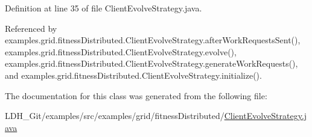 Definition at line 35 of file Client\-Evolve\-Strategy.\-java.



Referenced by examples.\-grid.\-fitness\-Distributed.\-Client\-Evolve\-Strategy.\-after\-Work\-Requests\-Sent(), examples.\-grid.\-fitness\-Distributed.\-Client\-Evolve\-Strategy.\-evolve(), examples.\-grid.\-fitness\-Distributed.\-Client\-Evolve\-Strategy.\-generate\-Work\-Requests(), and examples.\-grid.\-fitness\-Distributed.\-Client\-Evolve\-Strategy.\-initialize().



The documentation for this class was generated from the following file\-:\begin{DoxyCompactItemize}
\item 
L\-D\-H\-\_\-\-Git/examples/src/examples/grid/fitness\-Distributed/\hyperlink{fitness_distributed_2_client_evolve_strategy_8java}{Client\-Evolve\-Strategy.\-java}\end{DoxyCompactItemize}
